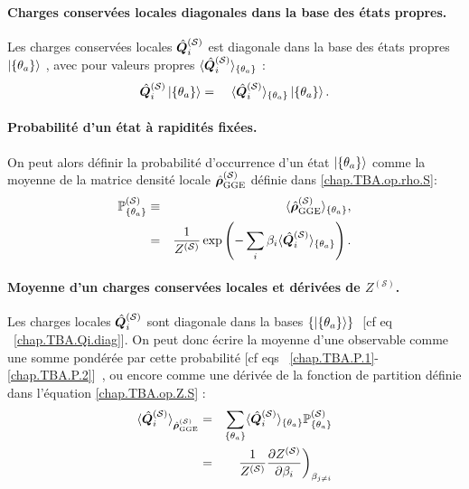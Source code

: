 \paragraph{Charges conservées locales diagonales dans la base des états propres.}
Les charges conservées locales $\hat{\bm{Q}}_i^{(\mathcal{S})}$ est diagonale dans la base des  états propres $\ket{ \{ \theta_a \}}$ , avec pour valeurs propres $\langle \hat{\bm{Q}}_i^{(\mathcal{S})} \rangle_{\{\theta_a \}} $ 	 :
\begin{eqnarray}\label{chap.TBA.Qi.diag}
	\operator{Q}_i^{(\mathcal{S})}\ket{\{\theta_a \}} & = &  \langle \operator{Q}_i^{(\mathcal{S})} \rangle_{\{\theta_a \}}  \ket{\{\theta_a \}}.		
\end{eqnarray}
\paragraph{Probabilité d’un état à rapidités fixées.}
On peut alors définir la probabilité d’occurrence d’un état $\ket{\{ \theta_a \} }$ comme la moyenne de la matrice densité locale $\hat{\bm{\rho}}^{(\mathcal{S})}_{\mathrm{GGE}}$ définie dans \eqref{chap.TBA.op.rho.S}:
\begin{eqnarray}
	\mathbb{P}^{(\mathcal{S})}_{\{ \theta_a \}}  & \equiv &  \langle \hat{\bm{\rho}}^{(\mathcal{S})}_{\mathrm{GGE}} \rangle_{\{\theta_a \}}, \label{chap.TBA.P.1}\\
	& = & 
	\frac{1}{Z^{(\mathcal{S})}} \exp \left (- \sum_i \beta_i \langle \hat{\bm{Q}}_i^{(\mathcal{S})} \rangle_{\{\theta_a \}} \right ) \label{chap.TBA.P.2}.
\end{eqnarray}

\paragraph{Moyenne d’un charges conservées locales et dérivées de $Z^{(\mathcal{S})}$.} Les charges locales $\hat{\bm{Q}}_i^{(\mathcal{S})}$ sont diagonale dans la bases \( \{ \ket{\{\theta_a \}} \}  \) [cf eq~ ~\eqref{chap.TBA.Qi.diag}]. 
On peut donc  écrire la moyenne d’une observable comme une somme pondérée par cette probabilité [cf eqs ~\eqref{chap.TBA.P.1}-\eqref{chap.TBA.P.2}] , ou encore comme une dérivée de la fonction de partition définie dans l'équation \eqref{chap.TBA.op.Z.S} :
\begin{eqnarray}
	\langle \hat{\bm{Q}}_i^{(\mathcal{S})} \rangle_{\hat{\bm{\rho}}^{(\mathcal{S})}_{\mathrm{GGE}}} &= & \sum_{\{ \theta_a\}} \langle \hat{\bm{Q}}_i^{(\mathcal{S})} \rangle_{\{\theta_a \}} \mathbb{P}^{(\mathcal{S})}_{\{ \theta_a \}} \label{chap.TBA.moy.1}\\
	 & = &  \left. \frac{1}{Z^{(\mathcal{S})}} \frac{\partial Z^{(\mathcal{S})}}{\partial \beta_i} \right )_{\beta_{j \neq i }}	 \label{chap.TBA.moy.2}
\end{eqnarray}

